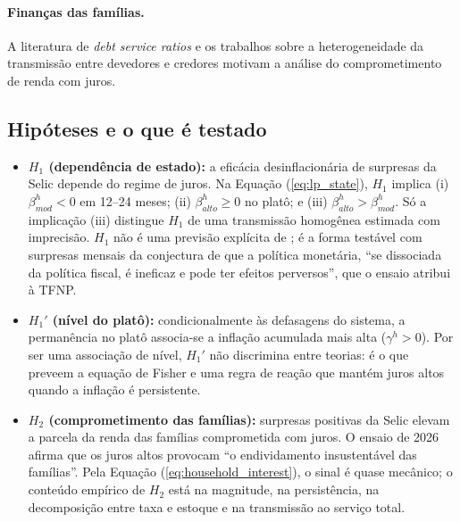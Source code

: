 \documentclass[12pt,a4paper]{article}
\begin{document}
\paragraph{Finanças das famílias.} A literatura de \textit{debt service ratios} \citep{drehmann2015how} e os trabalhos sobre a heterogeneidade da transmissão entre devedores e credores \citep{cloyne2020monetary, auclert2019monetary} motivam a análise do comprometimento de renda com juros.

\subsection{Hipóteses e o que é testado}

\begin{itemize}
    \item \textbf{$H_1$ (dependência de estado):} a eficácia desinflacionária de surpresas da Selic depende do regime de juros. Na Equação (\ref{eq:lp_state}), $H_1$ implica (i) $\beta_{mod}^h < 0$ em 12--24 meses; (ii) $\beta_{alto}^h \ge 0$ no platô; e (iii) $\beta_{alto}^h > \beta_{mod}^h$. Só a implicação (iii) distingue $H_1$ de uma transmissão homogênea estimada com imprecisão. $H_1$ não é uma previsão explícita de \citet{resende2026euacuso}; é a forma testável com surpresas mensais da conjectura de que a política monetária, ``se dissociada da política fiscal, é ineficaz e pode ter efeitos perversos'', que o ensaio atribui à TFNP.
    \item \textbf{$H_1'$ (nível do platô):} condicionalmente às defasagens do sistema, a permanência no platô associa-se a inflação acumulada mais alta ($\gamma^h > 0$). Por ser uma associação de nível, $H_1'$ não discrimina entre teorias: é o que preveem a equação de Fisher e uma regra de reação que mantém juros altos quando a inflação é persistente.
    \item \textbf{$H_2$ (comprometimento das famílias):} surpresas positivas da Selic elevam a parcela da renda das famílias comprometida com juros. O ensaio de 2026 afirma que os juros altos provocam ``o endividamento insustentável das famílias''. Pela Equação (\ref{eq:household_interest}), o sinal é quase mecânico; o conteúdo empírico de $H_2$ está na magnitude, na persistência, na decomposição entre taxa e estoque e na transmissão ao serviço total.
\end{itemize}
\end{document}
